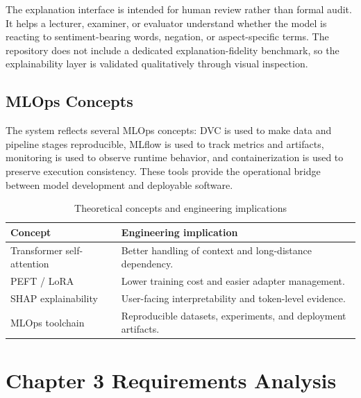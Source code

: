 \documentclass[12pt, a4paper]{article}
\begin{document}
The explanation interface is intended for human review rather than formal audit. It helps a lecturer, examiner, or evaluator understand whether the model is reacting to sentiment-bearing words, negation, or aspect-specific terms. The repository does not include a dedicated explanation-fidelity benchmark, so the explainability layer is validated qualitatively through visual inspection.

\subsection{MLOps Concepts}
The system reflects several MLOps concepts: DVC is used to make data and pipeline stages reproducible, MLflow is used to track metrics and artifacts, monitoring is used to observe runtime behavior, and containerization is used to preserve execution consistency. These tools provide the operational bridge between model development and deployable software.

\begin{table}[H]
\centering
\caption{Theoretical concepts and engineering implications}
\begin{tabularx}{\textwidth}{@{} p{3.5cm} X @{}}
\toprule
\textbf{Concept} & \textbf{Engineering implication} \\
\midrule
Transformer self-attention & Better handling of context and long-distance dependency. \\
PEFT / LoRA & Lower training cost and easier adapter management. \\
SHAP explainability & User-facing interpretability and token-level evidence. \\
MLOps toolchain & Reproducible datasets, experiments, and deployment artifacts. \\
\bottomrule
\end{tabularx}
\end{table}

\section{Chapter 3 Requirements Analysis}
\end{document}
